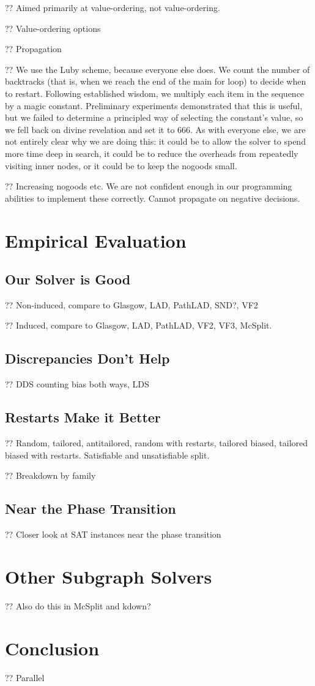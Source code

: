 \documentclass{article}
\begin{document}
?? Aimed primarily at value-ordering, not value-ordering.

?? Value-ordering options

?? Propagation

?? We use the Luby scheme, because everyone else does. We count the number of backtracks (that is,
when we reach the end of the main for loop) to decide when to restart. Following established wisdom,
we multiply each item in the sequence by a magic constant. Preliminary experiments demonstrated that
this is useful, but we failed to determine a principled way of selecting the constant's value, so we
fell back on divine revelation and set it to 666. As with everyone else, we are not entirely clear
why we are doing this: it could be to allow the solver to spend more time deep in search, it could
be to reduce the overheads from repeatedly visiting inner nodes, or it could be to keep the nogoods
small.

?? Increasing nogoods etc. We are not confident enough in our programming abilities to implement
these correctly. Cannot propagate on negative decisions.

\section{Empirical Evaluation}

\subsection{Our Solver is Good}

?? Non-induced, compare to Glasgow, LAD, PathLAD, SND?, VF2

?? Induced, compare to Glasgow, LAD, PathLAD, VF2, VF3, McSplit.

\subsection{Discrepancies Don't Help}

?? DDS counting bias both ways, LDS

\subsection{Restarts Make it Better}

?? Random, tailored, antitailored, random with restarts, tailored biased, tailored biased with
restarts. Satisfiable and unsatisfiable split.

?? Breakdown by family

\subsection{Near the Phase Transition}

?? Closer look at SAT instances near the phase transition

\section{Other Subgraph Solvers}

?? Also do this in McSplit and kdown?

\section{Conclusion}

?? Parallel



\end{document}
